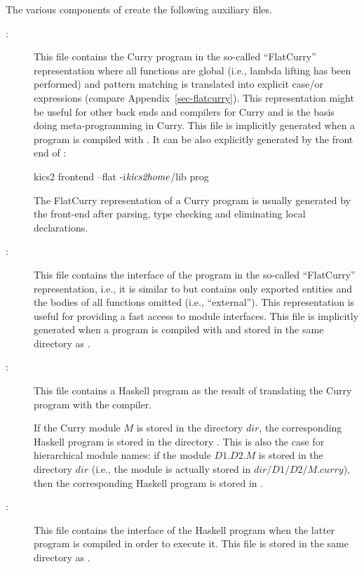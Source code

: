The various components of \CYS create the following auxiliary files.
\begin{description}
\item[:] This file contains the Curry program
in the so-called ``FlatCurry'' representation where all functions are global
(i.e., lambda lifting has been performed) and pattern matching
is translated into explicit case/or expressions
(compare Appendix~\ref{sec-flatcurry}).
This representation might be useful for other back ends and
compilers for Curry and is the basis doing meta-programming in Curry.
This file is implicitly
generated when a program is compiled with \CYS.
It can be also explicitly generated by the
front end of \CYS:
\begin{curry}
kics2 frontend --flat -i$\mbox{\textit{kics2home}}$/lib prog
\end{curry}
The FlatCurry representation of a Curry program is usually
generated by the front-end after parsing, type checking and eliminating
local declarations.

\item[:] This file contains the interface
of the program in the so-called ``FlatCurry'' representation,
i.e., it is similar to  but contains only exported
entities and the bodies of all functions omitted (i.e., ``external'').
This representation is useful for providing a fast access
to module interfaces.
This file is implicitly generated when a program is compiled with \CYS
and stored in the same directory as .

\item[:] This file contains a Haskell program
as the result of translating the Curry program with the
\CYS compiler.

If the Curry module $M$ is stored in the directory $dir$,
the corresponding Haskell program is stored in the directory
.
This is also the case for hierarchical module names:
if the module $D1.D2.M$ is stored in the directory $dir$
(i.e., the module is actually stored in $dir/D1/D2/M.curry$),
then the corresponding Haskell program is stored in
.

\item[:] This file contains the interface
of the Haskell program  when the latter program is
compiled in order to execute it.
This file is stored in the same directory as .


\end{description}
